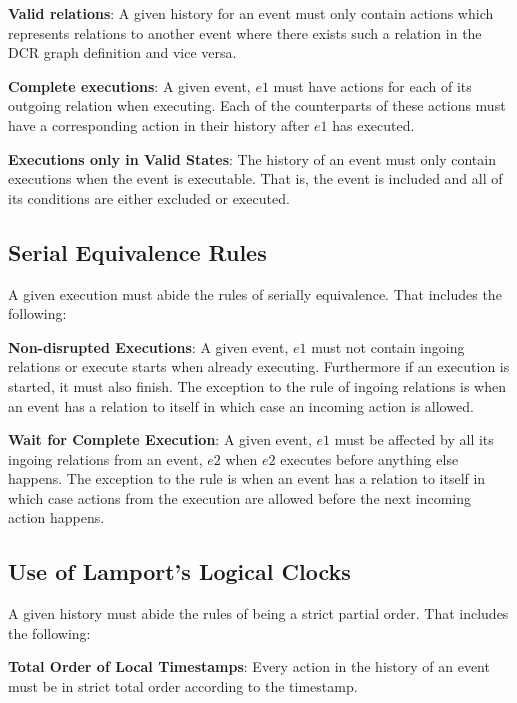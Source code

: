 	\newpar \textbf{Valid relations}: A given history for an event must only contain actions which represents relations to another event where there exists such a relation in the DCR graph definition and vice versa. 
	
	\newpar \textbf{Complete executions}: A given event, $e1$ must have actions for each of its outgoing relation when executing. Each of the counterparts of these actions must have a corresponding action in their history after $e1$ has executed.
	
	\newpar \textbf{Executions only in Valid States}: The history of an event must only contain executions when the event is executable. That is, the event is included and all of its conditions are either excluded or executed.
	
	\subsection{Serial Equivalence Rules}
	A given execution must abide the rules of serially equivalence. That includes the following:
	
	\newpar \textbf{Non-disrupted Executions}: A given event, $e1$ must not contain ingoing relations or execute starts when already executing. Furthermore if an execution is started, it must also finish. The exception to the rule of ingoing relations is when an event has a relation to itself in which case an incoming action is allowed.
	
	\newpar \textbf{Wait for Complete Execution}: A given event, $e1$ must be affected by all its ingoing relations from an event, $e2$ when $e2$ executes before anything else happens. The exception to the rule is when an event has a relation to itself in which case actions from the execution are allowed before the next incoming action happens. 
	
	\subsection{Use of Lamport's Logical Clocks}
	A given history must abide the rules of being a strict partial order. That includes the following:
	
	\newpar \textbf{Total Order of Local Timestamps}: Every action in the history of an event must be in strict total order according to the timestamp.
	
